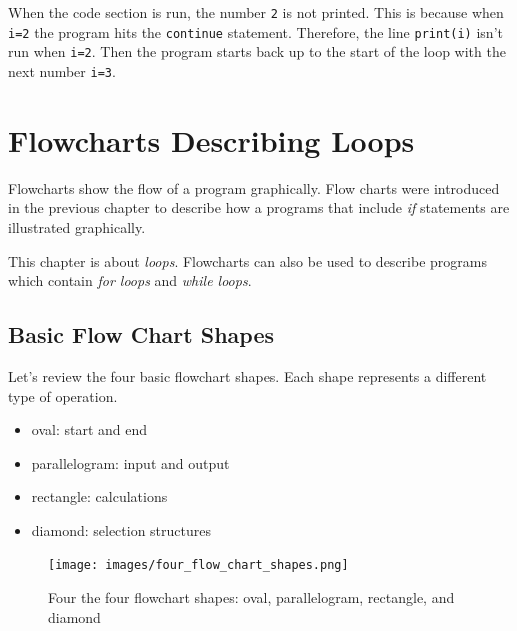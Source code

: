 \documentclass{book}
\providecommand{\tightlist}{%
      \setlength{\itemsep}{0pt}\setlength{\parskip}{0pt}}
\begin{document}
    
        When the code section is run, the number \lstinline!2! is not printed.
This is because when \lstinline!i=2! the program hits the
\lstinline!continue! statement. Therefore, the line \lstinline!print(i)!
isn't run when \lstinline!i=2!. Then the program starts back up to the
start of the loop with the next number \lstinline!i=3!.
    




    
        \section{Flowcharts Describing Loops}\label{flowcharts-describing-loops}
    




    
        Flowcharts show the flow of a program graphically. Flow charts were
introduced in the previous chapter to describe how a programs that
include \emph{if} statements are illustrated graphically.

This chapter is about \emph{loops}. Flowcharts can also be used to
describe programs which contain \emph{for loops} and \emph{while loops}.
    




    
        \subsection{Basic Flow Chart Shapes}\label{basic-flow-chart-shapes}
    




    
        Let's review the four basic flowchart shapes. Each shape represents a
different type of operation.

\begin{itemize}
\tightlist
\item
  oval: start and end
\item
  parallelogram: input and output
\item
  rectangle: calculations
\item
  diamond: selection structures
\end{itemize}

\begin{figure}
\centering
\texttt{[image: images/four\_flow\_chart\_shapes.png]}
\caption{Four the four flowchart shapes: oval, parallelogram, rectangle,
and diamond}
\end{figure}
\end{document}
